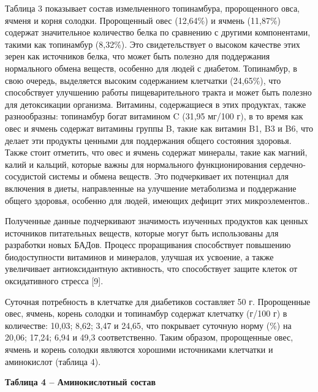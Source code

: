 Таблица 3 показывает состав измельченного топинамбура, пророщенного
овса, ячменя и корня солодки. Пророщенный овес (12,64\%) и ячмень
(11,87\%) содержат значительное количество белка по сравнению с другими
компонентами, такими как топинамбур (8,32\%). Это свидетельствует о
высоком качестве этих зерен как источников белка, что может быть полезно
для поддержания нормального обмена веществ, особенно для людей с
диабетом. Топинамбур, в свою очередь, выделяется высоким содержанием
клетчатки (24,65\%), что способствует улучшению работы пищеварительного
тракта и может быть полезно для детоксикации организма. Витамины,
содержащиеся в этих продуктах, также разнообразны: топинамбур богат
витамином C (31,95 мг/100 г), в то время как овес и ячмень содержат
витамины группы B, такие как витамин B1, B3 и B6, что делает эти
продукты ценными для поддержания общего состояния здоровья. Также стоит
отметить, что овес и ячмень содержат минералы, такие как магний, калий и
кальций, которые важны для нормального функционирования
сердечно-сосудистой системы и обмена веществ. Это подчеркивает их
потенциал для включения в диеты, направленные на улучшение метаболизма и
поддержание общего здоровья, особенно для людей, имеющих дефицит этих
микроэлементов..

Полученные данные подчеркивают значимость изученных продуктов как ценных
источников питательных веществ, которые могут быть использованы для
разработки новых БАДов. Процесс проращивания способствует повышению
биодоступности витаминов и минералов, улучшая их усвоение, а также
увеличивает антиоксидантную активность, что способствует защите клеток
от оксидативного стресса {[}9{]}.

Суточная потребность в клетчатке для диабетиков составляет 50 г.
Пророщенные овес, ячмень, корень солодки и топинамбур содержат клетчатку
(г/100 г) в количестве: 10,03; 8,62; 3,47 и 24,65, что покрывает
суточную норму (\%) на 20,06; 17,24; 6,94 и 49,3 соответственно. Таким
образом, пророщенные овес, ячмень и корень солодки являются хорошими
источниками клетчатки и аминокислот (таблица 4).

{\bfseries Таблица 4 -- Аминокислотный состав}

